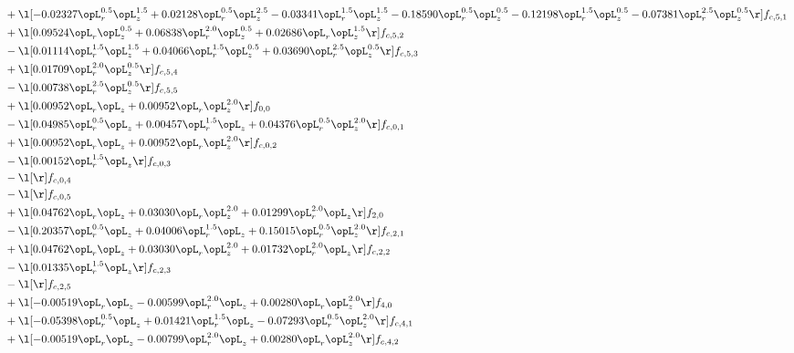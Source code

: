 \begin{alignat}{2}
& + \l[  -0.02327 \opL_r^{0.5} \opL_z^{1.5} +  0.02128 \opL_r^{0.5} \opL_z^{2.5}   -0.03341 \opL_r^{1.5} \opL_z^{1.5}   -0.18590 \opL_r^{0.5} \opL_z^{0.5}   -0.12198 \opL_r^{1.5} \opL_z^{0.5}   -0.07381 \opL_r^{2.5} \opL_z^{0.5}  \r] f_{c,5,1} \nonumber \\ 
& + \l[  0.09524 \opL_r \opL_z^{0.5} +  0.06838 \opL_r^{2.0} \opL_z^{0.5} +  0.02686 \opL_r \opL_z^{1.5}  \r] f_{c,5,2} \nonumber \\ 
& - \l[  0.01114 \opL_r^{1.5} \opL_z^{1.5} +  0.04066 \opL_r^{1.5} \opL_z^{0.5} +  0.03690 \opL_r^{2.5} \opL_z^{0.5}  \r] f_{c,5,3} \nonumber \\ 
& + \l[  0.01709 \opL_r^{2.0} \opL_z^{0.5}  \r] f_{c,5,4} \nonumber \\ 
& - \l[  0.00738 \opL_r^{2.5} \opL_z^{0.5}  \r] f_{c,5,5} \nonumber \\ 
& + \l[  0.00952 \opL_r \opL_z +  0.00952 \opL_r \opL_z^{2.0}  \r] f_{0,0} \nonumber \\ 
& - \l[  0.04985 \opL_r^{0.5} \opL_z +  0.00457 \opL_r^{1.5} \opL_z +  0.04376 \opL_r^{0.5} \opL_z^{2.0}  \r] f_{c,0,1} \nonumber \\ 
& + \l[  0.00952 \opL_r \opL_z +  0.00952 \opL_r \opL_z^{2.0}  \r] f_{c,0,2} \nonumber \\ 
& - \l[  0.00152 \opL_r^{1.5} \opL_z  \r] f_{c,0,3} \nonumber \\ 
& - \l[  \r] f_{c,0,4} \nonumber \\ 
& - \l[  \r] f_{c,0,5} \nonumber \\ 
& + \l[  0.04762 \opL_r \opL_z +  0.03030 \opL_r \opL_z^{2.0} +  0.01299 \opL_r^{2.0} \opL_z  \r] f_{2,0} \nonumber \\ 
& - \l[  0.20357 \opL_r^{0.5} \opL_z +  0.04006 \opL_r^{1.5} \opL_z +  0.15015 \opL_r^{0.5} \opL_z^{2.0}  \r] f_{c,2,1} \nonumber \\ 
& + \l[  0.04762 \opL_r \opL_z +  0.03030 \opL_r \opL_z^{2.0} +  0.01732 \opL_r^{2.0} \opL_z  \r] f_{c,2,2} \nonumber \\ 
& - \l[  0.01335 \opL_r^{1.5} \opL_z  \r] f_{c,2,3} \nonumber \\ 
& - \l[  \r] f_{c,2,5} \nonumber \\ 
& + \l[  -0.00519 \opL_r \opL_z   -0.00599 \opL_r^{2.0} \opL_z +  0.00280 \opL_r \opL_z^{2.0}  \r] f_{4,0} \nonumber \\ 
& + \l[  -0.05398 \opL_r^{0.5} \opL_z +  0.01421 \opL_r^{1.5} \opL_z   -0.07293 \opL_r^{0.5} \opL_z^{2.0}  \r] f_{c,4,1} \nonumber \\ 
& + \l[  -0.00519 \opL_r \opL_z   -0.00799 \opL_r^{2.0} \opL_z +  0.00280 \opL_r \opL_z^{2.0}  \r] f_{c,4,2} \nonumber \\ 

\end{alignat}
